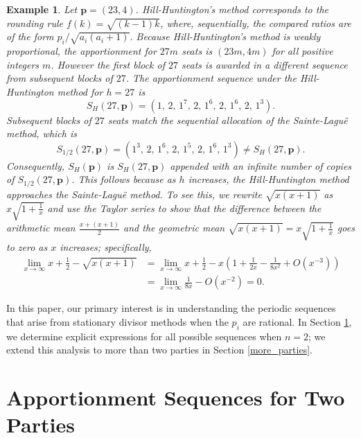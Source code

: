 \documentclass[pdflatex,sn-mathphys-num]{sn-jnl}
\theoremstyle{thmstyleone}%
\theoremstyle{thmstyletwo}%
\newtheorem{example}{Example}%
\theoremstyle{thmstylethree}%
\begin{document}
 \begin{example}  Let $\mathbf p = (23, 4)$. Hill-Huntington's method corresponds to the rounding rule $f(k) = \sqrt{(k-1)k}$, where, sequentially, the compared ratios are of the form $p_i / \sqrt{a_i\left(a_i+1\right)}$.    Because Hill-Huntington's method is weakly proportional, the apportionment for $27m$ seats is $(23m, 4m)$ for all positive integers $m$. However the first block of $27$ seats is awarded in a different sequence from subsequent blocks of $27$.  The apportionment sequence under the Hill-Huntington method for $h=27$ is
\begin{equation*}
S_{H}(27, \mathbf p) = (1, \,2, \,1^7, \,2, \,1^6, \,2, \,1^6, \, 2, \,1^3).
\end{equation*}
 Subsequent blocks of $27$ seats match the sequential allocation of the Sainte-Lagu\"{e} method, which is
 $$S_{1/2}(27, \mathbf p) = (1^3, \, 2, \, 1^6, \, 2, \, 1^5, \, 2, \, 1^6, \, 1^3) \ne S_{H}(27, \mathbf p).$$
 Consequently, $S_H(\mathbf p)$ is $S_{H}(27, \mathbf p)$ appended with an infinite number of copies of $S_{1/2}(27, \mathbf p)$.
This follows because as $h$ increases, the Hill-Huntington method approaches the Sainte-Lagu\"{e} method. To see this, we rewrite $\sqrt{x(x+1)}$ as $x \sqrt{1+\frac{1}{x}}$ and use the Taylor series to show that the difference between the arithmetic mean $\frac{x + (x+1)}{2}$ and the geometric mean $\sqrt{x(x+1)}= x \sqrt{1+\frac{1}{x}}$ goes to zero as $x$ increases;  specifically, 
\begin{align*}
\lim_{x \rightarrow \infty}  x + \frac{1}{2} - \sqrt{x(x+1)} &= \lim_{x \rightarrow \infty} x + \frac{1}{2} -  x\left(1+\frac{1}{2 x}-\frac{1}{8 x^2}+O\left(x^{-3}\right)\right) \\
&=\lim_{x \rightarrow \infty} \frac{1}{8 x}-O\left(x^{-2}\right) = 0. 
\end{align*}
\end{example}

In this paper, our primary interest  is in understanding the periodic sequences that arise from stationary divisor methods when the $p_i$ are rational. In  Section \ref{2parties},  we determine explicit expressions for all possible sequences when $n=2$; we extend this analysis to more than two parties in Section \ref{more_parties}. 


\section{Apportionment Sequences for Two Parties}\label{2parties}
\end{document}
